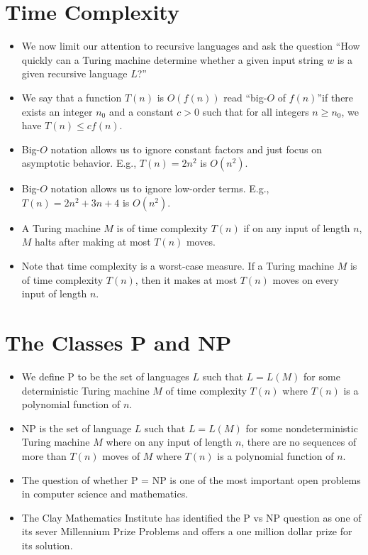 \documentclass[]{article}
\begin{document}
\section{Time Complexity}
\begin{itemize}
\item We now limit our attention to recursive languages and ask the question
``How quickly can a Turing machine determine whether a given input string $w$ is
a given recursive language $L$?''
\item We say that a function $T(n)$ is $O(f(n))$ \lbrack read ``big-$O$ of
$f(n)$''\rbrack if there exists an integer $n_0$ and a constant $c > 0$ such
that for all integers $n \geq n_0$, we have $T(n) \leq cf(n)$.
\item Big-$O$ notation allows us to ignore constant factors and just focus on
asymptotic behavior. E.g., $T(n) = 2n^2$ is $O(n^2)$.
\item Big-$O$ notation allows us to ignore low-order terms. E.g., $T(n) = 2n^2 +
3n + 4$ is $O(n^2)$.
\item A Turing machine $M$ is of time complexity $T(n)$ if on any input of
length $n$, $M$ halts after making at most $T(n)$ moves.
\item Note that time complexity is a worst-case measure. If a Turing machine $M$
is of time complexity $T(n)$, then it makes at most $T(n)$ moves on every input
of length $n$.
\end{itemize}

\section{The Classes P and NP}
\begin{itemize}
\item We define P to be the set of languages $L$ such that $L = L(M)$ for some
deterministic Turing machine $M$ of time complexity $T(n)$ where $T(n)$ is a
polynomial function of $n$.
\item NP is the set of language $L$ such that $L = L(M)$ for some
nondeterministic Turing machine $M$ where on any input of length $n$, there are
no sequences of more than $T(n)$ moves of $M$ where $T(n)$ is a polynomial
function of $n$.
\item The question of whether P = NP is one of the most important open problems
in computer science and mathematics.
\item The Clay Mathematics Institute has identified the P vs NP question as one
of its sever Millennium Prize Problems and offers a one million dollar prize for
its solution.
\end{itemize}
\end{document}
